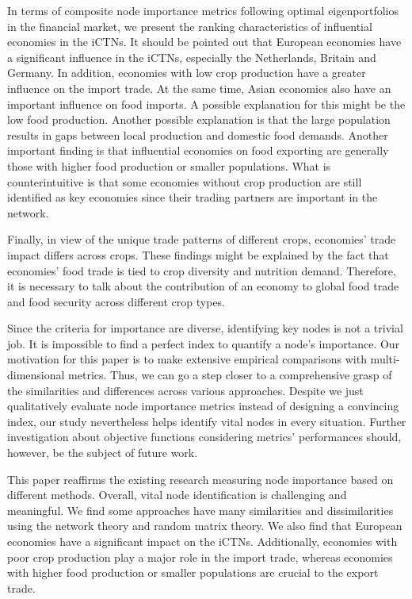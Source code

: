 \documentclass[preprint,3p,times,sort&compress]{elsarticle}
\begin{document}
In terms of composite node importance metrics following optimal eigenportfolios in the financial market, we present the ranking characteristics of influential economies in the iCTNs. It should be pointed out that European economies have a significant influence in the iCTNs, especially the Netherlands, Britain and Germany. In addition, economies with low crop production have a greater influence on the import trade. At the same time, Asian economies also have an important influence on food imports. A possible explanation for this might be the low food production. Another possible explanation is that the large population results in gaps between local production and domestic food demands. Another important finding is that influential economies on food exporting are generally those with higher food production or smaller populations. What is counterintuitive is that some economies without crop production are still identified as key economies since their trading partners
are important in the network. 

Finally, in view of the unique trade patterns of different crops, economies' trade impact differs across crops. These findings might be explained by the fact that economies' food trade is tied to crop diversity and nutrition demand. Therefore, it is necessary to talk about the contribution of an economy to global food trade and food security across different crop types.


Since the criteria for importance are diverse, identifying key nodes is not a trivial job. It is impossible to find a perfect index to quantify a node's importance. Our motivation for this paper is to make extensive empirical comparisons with multi-dimensional metrics. Thus, we can go a step closer to a comprehensive grasp of the similarities and differences across various approaches. Despite we just qualitatively evaluate node importance metrics instead of designing a convincing index, our study nevertheless helps identify vital nodes in every situation. Further investigation about objective functions considering metrics’ performances should, however, be the subject of future work.


This paper reaffirms the existing research measuring node importance based on different methods. Overall, vital node identification is challenging and meaningful. We find some approaches have many similarities and dissimilarities using the network theory and random matrix theory. We also find that European economies have a significant impact on the iCTNs. Additionally, economies with poor crop production play a major role in the import trade, whereas economies with higher food production or smaller populations are crucial to the export trade.
\end{document}
